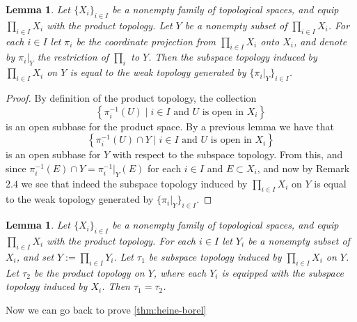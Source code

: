 \documentclass[11pt,a4paper]{article}
\theoremstyle{definition}
\theoremstyle{plain}
\newtheorem{lemma}[theorem]{Lemma}
\newcommand{\set}[2]{ \left\{ #1 \mid #2 \right\} }
\begin{document}
  \begin{lemma}
    Let $\{X_i\}_{i \in I}$ be a nonempty family of topological spaces, 
    and equip $\prod_{i \in I}{X_i}$ with the product topology. Let $Y$ be 
    a nonempty subset of $\prod_{i \in I}{X_i}$. For each $i \in I$ let 
    $\pi_i$ be the coordinate projection from $\prod_{i \in I}{X_i}$ onto 
    $X_i$, and denote by $\pi_i\vert_Y$ the restriction of $\prod_i$ to $Y$.
    Then the subspace topology induced by $\prod_{i \in I}{X_i}$ on $Y$ is 
    equal to the weak topology generated by $\{\pi_i \vert_Y\}_{i \in I}$.
  \end{lemma}
  \begin{proof}
    By definition of the product topology, the collection
    \[
      \set{\pi_{i}^{-1}(U)}{\text{$i \in I$ and $U$ is open in $X_i$}}
    \]
    is an open subbase for the product space. By a previous lemma
    we have that
    \[
      \set{\pi_{i}^{-1}(U) \cap Y}
      {\text{$i \in I$ and $U$ is open in $X_i$}}
    \]
    is an open subbase for $Y$ with respect to the subspace topology.
    From this, and since $\pi_{i}^{-1}(E) \cap Y = \pi_{i}^{-1} \vert_Y(E)$
    for each $i \in I$ and $E \subset X_i$, and now by Remark $2.4$ we
    see that indeed the subspace topology induced by $\prod_{i \in I}{X_i}$ 
    on $Y$ is equal to the weak topology generated by 
    $\{\pi_i \vert_Y\}_{i \in I}$.
  \end{proof}

  \begin{lemma}
    Let $\{X_i\}_{i \in I}$ be a nonempty family of topological spaces, 
    and equip $\prod_{i \in I}{X_i}$ with the product topology. For each 
    $i \in I$ let $Y_i$ be a nonempty subset of $X_i$, and set 
    $Y := \prod_{i \in I}{Y_i}$. Let $\tau_1$ be subspace topology induced 
    by $\prod_{i \in I}{X_i}$ on $Y$. Let $\tau_2$ be the product topology 
    on $Y$, where each $Y_i$ is equipped with the subspace topology induced 
    by $X_i$. Then $\tau_1 = \tau_2$.
  \end{lemma}

  Now we can go back to prove \autoref{thm:heine-borel}
\end{document}
